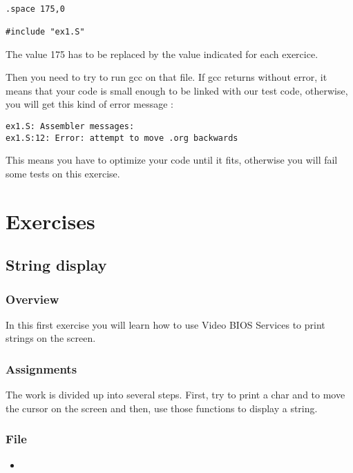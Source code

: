 \begin{verbatim}

.space 175,0

#include "ex1.S"

\end{verbatim}

The value 175 has to be replaced by the value indicated for each exercice.

Then you need to try to run gcc on that file. If gcc returns without error, it means that your code is small enough to be linked with our test code, otherwise, you will get this kind of error message :

\begin{verbatim}
ex1.S: Assembler messages:
ex1.S:12: Error: attempt to move .org backwards
\end{verbatim}

This means you have to optimize your code until it fits, otherwise you will fail some tests on this exercise.

%
%

\newpage

\section{Exercises}

\subsection{String display}

\subsubsection*{Overview}
In this first exercise you will learn how to use Video BIOS Services to
print strings on the screen.

\subsubsection*{Assignments}
The work is divided up into several steps. First, try to print a char and
to move the cursor on the screen and then, use those functions to display
a string.

\subsubsection*{File}
\begin{itemize}
  \item {}
\end{itemize}

